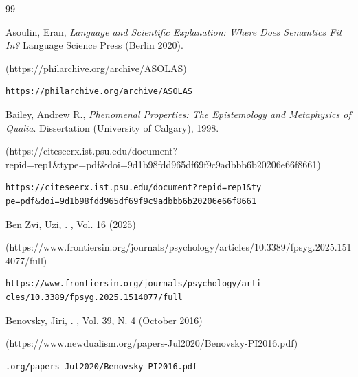 \begin{thebibliography}{99}
{\begin{bItem}[EranAsoulin]
Asoulin, Eran, 
\textit{Language and Scientific Explanation: Where Does Semantics Fit In?}
Language Science Press (Berlin 2020).
%
\begin{boxurl}(https://philarchive.org/archive/ASOLAS)
\begin{lstlisting}
https://philarchive.org/archive/ASOLAS
\end{lstlisting}
\end{boxurl}\end{bItem}






\begin{bItem}[AndrewRBailey]
Bailey, Andrew R., 
\textit{Phenomenal Properties: The Epistemology and Metaphysics of Qualia}.
Dissertation (University of Calgary), 1998.
%
\begin{boxurl}(https://citeseerx.ist.psu.edu/document?repid=rep1&type=pdf&doi=9d1b98fdd965df69f9c9adbbb6b20206e66f8661)
\begin{lstlisting}
https://citeseerx.ist.psu.edu/document?repid=rep1&ty
pe=pdf&doi=9d1b98fdd965df69f9c9adbbb6b20206e66f8661
\end{lstlisting}
\end{boxurl}\end{bItem}


\begin{bItem}[UziBenZvi]
Ben Zvi, Uzi,   
.
,
Vol. 16 (2025) 
%
\begin{boxurl}(https://www.frontiersin.org/journals/psychology/articles/10.3389/fpsyg.2025.1514077/full)
\begin{lstlisting}
https://www.frontiersin.org/journals/psychology/arti
cles/10.3389/fpsyg.2025.1514077/full
\end{lstlisting}
\end{boxurl}\end{bItem}





\begin{bItem}[JiriBenovsky]
Benovsky, Jiri,  
.
,
Vol. 39, N. 4 (October 2016) 
%
\begin{boxurl}(https://www.newdualism.org/papers-Jul2020/Benovsky-PI2016.pdf)
\begin{lstlisting}
.org/papers-Jul2020/Benovsky-PI2016.pdf
\end{lstlisting}
\end{boxurl}\end{bItem}





}
\end{thebibliography}
